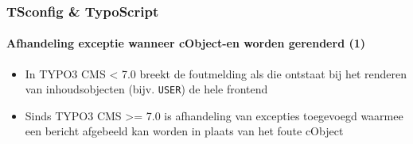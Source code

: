 \begin{frame}[fragile]
	\frametitle{TSconfig \& TypoScript}
	\framesubtitle{Afhandeling exceptie wanneer cObject-en worden gerenderd (1)}

	\begin{itemize}
		\item In TYPO3 CMS < 7.0 breekt de foutmelding als die ontstaat bij het renderen van inhoudsobjecten (bijv. \texttt{USER}) de hele frontend
		\item Sinds TYPO3 CMS >= 7.0 is afhandeling van excepties toegevoegd waarmee een bericht afgebeeld kan worden in plaats van het foute cObject
	\end{itemize}

%

\end{frame}


